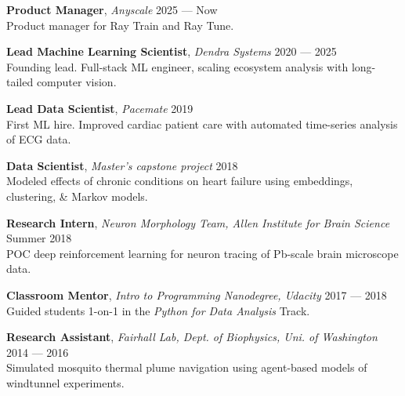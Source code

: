\documentclass[a4paper,12pt]{article}
\newcommand{\ressubheading}[4]{
    \textbf{#1} \hfill #2\\
    \textit{#3} \hfill #4 \\}
\begin{document}
    {\setlength{\parskip}{8pt}

    \textbf{Product Manager}, \textit{Anyscale} \hfill 2025 --- Now \\
    Product manager for Ray Train and Ray Tune.

    \textbf{Lead Machine Learning Scientist}, \textit{Dendra Systems} \hfill 2020 --- 2025 \\
    Founding lead. Full-stack ML engineer, scaling ecosystem analysis with long-tailed computer vision.


    \textbf{Lead Data Scientist}, \textit{Pacemate} \hfill 2019 \\
    First ML hire. Improved cardiac patient care with automated time-series analysis of ECG data.

    \textbf{Data Scientist}, \textit{Master's capstone project} \hfill 2018\\
    Modeled effects of chronic conditions on heart failure using embeddings, clustering, \& Markov models.

    \textbf{Research Intern}, \textit{Neuron Morphology Team, Allen Institute for Brain Science} \hfill Summer 2018\\
    POC deep reinforcement learning for neuron tracing of Pb-scale brain microscope data.


    \textbf{Classroom Mentor}, \textit{Intro to Programming Nanodegree, Udacity} \hfill 2017 --- 2018\\
    Guided students 1-on-1 in the \textit{Python for Data Analysis} Track.

    \textbf{Research Assistant}, \textit{Fairhall Lab, Dept. of Biophysics, Uni. of Washington} \hfill 2014 --- 2016\\
    Simulated mosquito thermal plume navigation using agent-based models of windtunnel experiments.\\


    }
\end{document}
